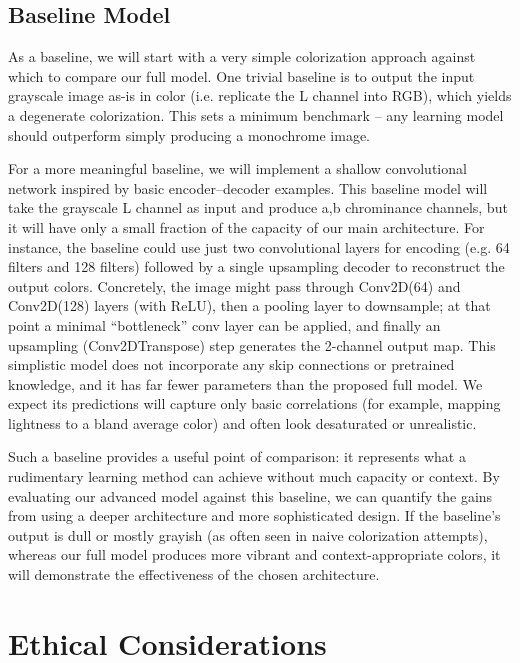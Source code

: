 \documentclass{article} %
\begin{document}
\subsection{Baseline Model}

As a baseline, we will start with a very simple colorization approach against which to compare our full model. One trivial baseline is to output the input grayscale image as-is in color (i.e. replicate the L channel into RGB), which yields a degenerate colorization. This sets a minimum benchmark – any learning model should outperform simply producing a monochrome image.

For a more meaningful baseline, we will implement a shallow convolutional network inspired by basic encoder–decoder examples. \cite{leatvanich2025image} This baseline model will take the grayscale L channel as input and produce a,b chrominance channels, but it will have only a small fraction of the capacity of our main architecture. For instance, the baseline could use just two convolutional layers for encoding (e.g. 64 filters and 128 filters) followed by a single upsampling decoder to reconstruct the output colors. Concretely, the image might pass through Conv2D(64) and Conv2D(128) layers (with ReLU), then a pooling layer to downsample; at that point a minimal “bottleneck” conv layer can be applied, and finally an upsampling (Conv2DTranspose) step generates the 2-channel output map. \cite{leatvanich2025image} This simplistic model does not incorporate any skip connections or pretrained knowledge, and it has far fewer parameters than the proposed full model. We expect its predictions will capture only basic correlations (for example, mapping lightness to a bland average color) and often look desaturated or unrealistic. \cite{rosebrock2019bwcolorization}

Such a baseline provides a useful point of comparison: it represents what a rudimentary learning method can achieve without much capacity or context. By evaluating our advanced model against this baseline, we can quantify the gains from using a deeper architecture and more sophisticated design. If the baseline’s output is dull or mostly grayish (as often seen in naive colorization attempts), whereas our full model produces more vibrant and context-appropriate colors, it will demonstrate the effectiveness of the chosen architecture. \cite{rosebrock2019bwcolorization}

\section{Ethical Considerations}
\label{ethical}
\end{document}
